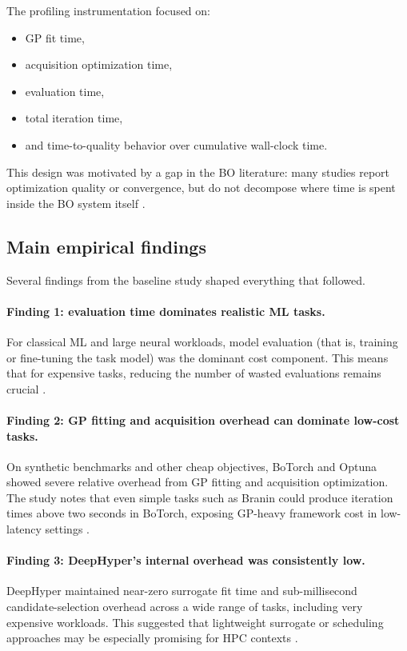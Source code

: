 \documentclass[11pt]{article}
\begin{document}
The profiling instrumentation focused on:
\begin{itemize}[leftmargin=1.5em]
    \item GP fit time,
    \item acquisition optimization time,
    \item evaluation time,
    \item total iteration time,
    \item and time-to-quality behavior over cumulative wall-clock time.
\end{itemize}

This design was motivated by a gap in the BO literature: many studies report optimization quality or convergence, but do not decompose where time is spent inside the BO system itself \cite{oumer2026baseline}.

\subsection{Main empirical findings}

Several findings from the baseline study shaped everything that followed.

\paragraph{Finding 1: evaluation time dominates realistic ML tasks.}
For classical ML and large neural workloads, model evaluation (that is, training or fine-tuning the task model) was the dominant cost component. This means that for expensive tasks, reducing the number of wasted evaluations remains crucial \cite{oumer2026baseline}.

\paragraph{Finding 2: GP fitting and acquisition overhead can dominate low-cost tasks.}
On synthetic benchmarks and other cheap objectives, BoTorch and Optuna showed severe relative overhead from GP fitting and acquisition optimization. The study notes that even simple tasks such as Branin could produce iteration times above two seconds in BoTorch, exposing GP-heavy framework cost in low-latency settings \cite{oumer2026baseline}.

\paragraph{Finding 3: DeepHyper's internal overhead was consistently low.}
DeepHyper maintained near-zero surrogate fit time and sub-millisecond candidate-selection overhead across a wide range of tasks, including very expensive workloads. This suggested that lightweight surrogate or scheduling approaches may be especially promising for HPC contexts \cite{oumer2026baseline}.
\end{document}
